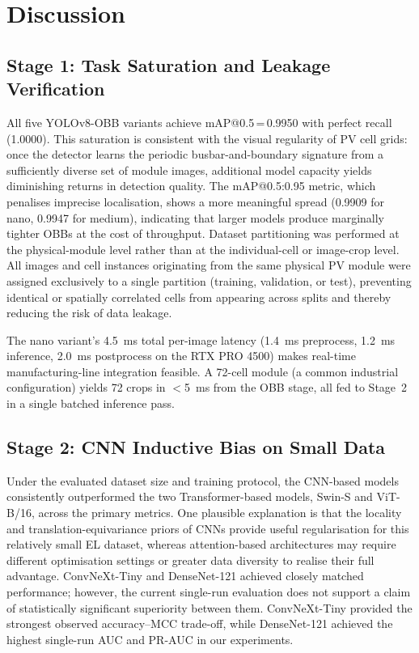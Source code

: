 \documentclass[conference]{IEEEtran}
\begin{document}
\section{Discussion}
\label{sec:discussion}

\subsection{Stage 1: Task Saturation and Leakage Verification}

All five YOLOv8-OBB variants achieve mAP@0.5\,=\,0.9950 with perfect recall (1.0000). This saturation is consistent with the visual regularity of PV cell grids: once the detector learns the periodic busbar-and-boundary signature from a sufficiently diverse set of module images, additional model capacity yields diminishing returns in detection quality. The mAP@0.5:0.95 metric, which penalises imprecise localisation, shows a more meaningful spread (0.9909 for nano, 0.9947 for medium), indicating that larger models produce marginally tighter OBBs at the cost of throughput. Dataset partitioning was performed at the physical-module level rather than at the individual-cell or image-crop level. All images and cell instances originating from the same physical PV module were assigned exclusively to a single partition (training, validation, or test), preventing identical or spatially correlated cells from appearing across splits and thereby reducing the risk of data leakage.

The nano variant's 4.5~ms total per-image latency (1.4~ms preprocess, 1.2~ms inference, 2.0~ms postprocess on the RTX PRO 4500) makes real-time manufacturing-line integration feasible. A 72-cell module (a common industrial configuration) yields 72 crops in $<$5~ms from the OBB stage, all fed to Stage~2 in a single batched inference pass.

\subsection{Stage 2: CNN Inductive Bias on Small Data}

Under the evaluated dataset size and training protocol, the CNN-based models consistently outperformed the two Transformer-based models, Swin-S and ViT-B/16, across the primary metrics. One plausible explanation is that the locality and translation-equivariance priors of CNNs provide useful regularisation for this relatively small EL dataset, whereas attention-based architectures may require different optimisation settings or greater data diversity to realise their full advantage. ConvNeXt-Tiny and DenseNet-121 achieved closely matched performance; however, the current single-run evaluation does not support a claim of statistically significant superiority between them. ConvNeXt-Tiny provided the strongest observed accuracy--MCC trade-off, while DenseNet-121 achieved the highest single-run AUC and PR-AUC in our experiments.
\end{document}
